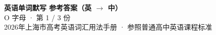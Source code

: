 \documentclass[10pt,a4paper]{article}
\begin{document}
\pagestyle{plain}

\begin{center}
{\LARGE\bfseries 英语单词默写 \quad 参考答案（英 $\to$ 中）}\\[0.22em]
{\large O 字母 · 第 1 / 3 份}\\[0.18em]
{\small 2026年上海市高考英语词汇用法手册 · 参照普通高中英语课程标准}
\end{center}

\vspace{0.2em}
\noindent{\color{rulegray}\rule{\textwidth}{0.8pt}}

\vspace{0.35em}

\vspace{0.25em}
\renewcommand{\arraystretch}{1.32}
\end{document}
